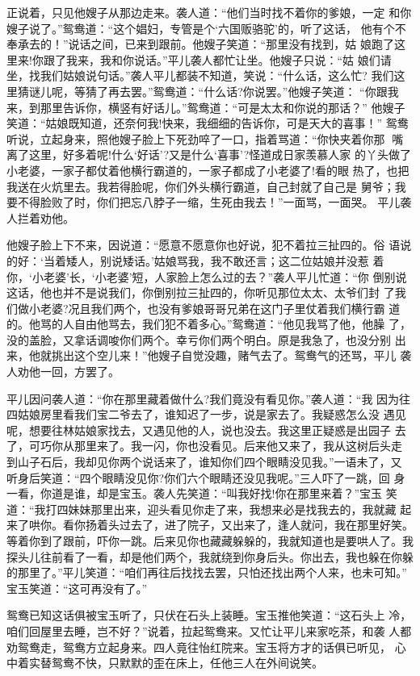 正说着，只见他嫂子从那边走来。袭人道：“他们当时找不着你的爹娘，一定
和你嫂子说了。”鸳鸯道：“这个娼妇，专管是个‘六国贩骆驼’的，听了这话，
他有个不奉承去的！”说话之间，已来到跟前。他嫂子笑道：“那里没有找到，姑
娘跑了这里来!你跟了我来，我和你说话。”平儿袭人都忙让坐。他嫂子只说：“姑
娘们请坐，找我们姑娘说句话。”袭人平儿都装不知道，笑说：“什么话，这么忙?
我们这里猜谜儿呢，等猜了再去罢。”鸳鸯道：“什么话?你说罢。”他嫂子笑道：
“你跟我来，到那里告诉你，横竖有好话儿。”鸳鸯道：“可是太太和你说的那话？”
他嫂子笑道：“姑娘既知道，还奈何我!快来，我细细的告诉你，可是天大的喜事！”
鸳鸯听说，立起身来，照他嫂子脸上下死劲啐了一口，指着骂道：“你快夹着你那
嘴离了这里，好多着呢!什么‘好话’?又是什么‘喜事’?怪道成日家羡慕人家
的丫头做了小老婆，一家子都仗着他横行霸道的，一家子都成了小老婆了!看的眼
热了，也把我送在火炕里去。我若得脸呢，你们外头横行霸道，自己封就了自己是
舅爷；我要不得脸败了时，你们把忘八脖子一缩，生死由我去！”一面骂，一面哭。
平儿袭人拦着劝他。

他嫂子脸上下不来，因说道：“愿意不愿意你也好说，犯不着拉三扯四的。俗
语说的好：‘当着矮人，别说矮话。’姑娘骂我，我不敢还言；这二位姑娘并没惹
着你，‘小老婆’长，‘小老婆’短，人家脸上怎么过的去？”袭人平儿忙道：“你
倒别说这话，他也并不是说我们，你倒别拉三扯四的，你听见那位太太、太爷们封
了我们做小老婆?况且我们两个，也没有爹娘哥哥兄弟在这门子里仗着我们横行霸
道的。他骂的人自由他骂去，我们犯不着多心。”鸳鸯道：“他见我骂了他，他臊
了，没的盖脸，又拿话调唆你们两个。幸亏你们两个明白。原是我急了，也没分别
出来，他就挑出这个空儿来！”他嫂子自觉没趣，赌气去了。鸳鸯气的还骂，平儿
袭人劝他一回，方罢了。

平儿因问袭人道：“你在那里藏着做什么?我们竟没有看见你。”袭人道：“我
因为往四姑娘房里看我们宝二爷去了，谁知迟了一步，说是家去了。我疑惑怎么没
遇见呢，想要往林姑娘家找去，又遇见他的人，说也没去。我这里正疑惑是出园子
去了，可巧你从那里来了。我一闪，你也没看见。后来他又来了，我从这树后头走
到山子石后，我却见你两个说话来了，谁知你们四个眼睛没见我。”一语未了，又
听身后笑道：“四个眼睛没见你?你们六个眼睛还没见我呢。”三人吓了一跳，回
身一看，你道是谁，却是宝玉。袭人先笑道：“叫我好找!你在那里来着？”宝玉
笑道：“我打四妹妹那里出来，迎头看见你走了来，我想来必是找我去的，我就藏
起来了哄你。看你扬着头过去了，进了院子，又出来了，逢人就问，我在那里好笑。
等着你到了跟前，吓你一跳。后来见你也藏藏躲躲的，我就知道也是要哄人了。我
探头儿往前看了一看，却是他们两个，我就绕到你身后头。你出去，我也躲在你躲
的那里了。”平儿笑道：“咱们再往后找找去罢，只怕还找出两个人来，也未可知。”
宝玉笑道：“这可再没有了。”

鸳鸯已知这话俱被宝玉听了，只伏在石头上装睡。宝玉推他笑道：“这石头上
冷，咱们回屋里去睡，岂不好？”说着，拉起鸳鸯来。又忙让平儿来家吃茶，和袭
人都劝鸳鸯走，鸳鸯方立起身来。四人竟往怡红院来。宝玉将方才的话俱已听见，
心中着实替鸳鸯不快，只默默的歪在床上，任他三人在外间说笑。

